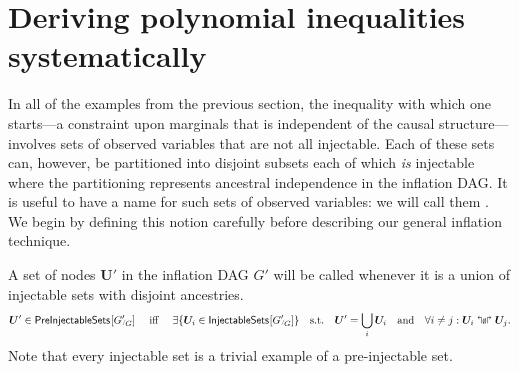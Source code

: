 
\color{black}

\section{Deriving polynomial inequalities systematically}
\label{sec:ineqs}

In all of the examples from the previous section, the inequality with which one starts---a constraint upon marginals that is independent of the causal structure---involves sets of observed variables that are not all injectable.  Each of these sets can, however, be partitioned into disjoint subsets each of which {\em is} injectable where the partitioning represents ancestral independence in the inflation DAG.  It is useful to have a name for such sets of observed variables: we will call them .  We begin by defining this notion carefully before describing our general inflation technique. 

A set of nodes $\bm{U}'$ in the inflation DAG $G'$ will be called  whenever it is a union of injectable sets with disjoint ancestries. 
\begin{align}\label{eq:defpreinj}
\bm{U}'\in{\operatorname{\mathsf{PreInjectableSets}}_{}}\lbrack{G'}_{\!\!^{/\!}G}\rbrack \quad\text{ iff }\quad  \exists \{ \bm{U}_i \in {\operatorname{\mathsf{InjectableSets}}_{}}\lbrack{G'}_{\!\!^{/\!}G}\rbrack \} \quad \text{s.t.}\quad \bm{U}'=\bigcup_i \bm{U}_i  \quad\text{and} \quad  \forall i\ne j: \bm{U}_i \mathrel{\mathopen{\Lsh}{\scriptstyle\emptyset}\mathclose{\Rsh}} \bm{U}_j.
\end{align}
Note that every injectable set is a trivial example of a pre-injectable set.

